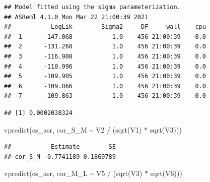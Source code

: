 \documentclass[
  12pt,
]{book}
\newenvironment{Shaded}{\begin{snugshade}}{\end{snugshade}}
\newcommand{\AttributeTok}[1]{\textcolor[rgb]{0.77,0.63,0.00}{#1}}
\newcommand{\ConstantTok}[1]{\textcolor[rgb]{0.00,0.00,0.00}{#1}}
\newcommand{\DecValTok}[1]{\textcolor[rgb]{0.00,0.00,0.81}{#1}}
\newcommand{\FunctionTok}[1]{\textcolor[rgb]{0.00,0.00,0.00}{#1}}
\newcommand{\NormalTok}[1]{#1}
\newcommand{\SpecialCharTok}[1]{\textcolor[rgb]{0.00,0.00,0.00}{#1}}
\begin{document}
\begin{verbatim}
## Model fitted using the sigma parameterization.
## ASReml 4.1.0 Mon Mar 22 21:00:39 2021
##           LogLik        Sigma2     DF     wall    cpu
##  1      -147.068           1.0    456 21:00:39    0.0
##  2      -131.268           1.0    456 21:00:39    0.0
##  3      -116.908           1.0    456 21:00:39    0.0
##  4      -110.996           1.0    456 21:00:39    0.0
##  5      -109.905           1.0    456 21:00:39    0.0
##  6      -109.866           1.0    456 21:00:39    0.0
##  7      -109.863           1.0    456 21:00:39    0.0
\end{verbatim}

\begin{Shaded}
\end{Shaded}

\begin{verbatim}
## [1] 0.0002038324
\end{verbatim}

\begin{Shaded}
\begin{Highlighting}[]
\FunctionTok{vpredict}\NormalTok{(cs\_asr, cor\_S\_M }\SpecialCharTok{\textasciitilde{}}\NormalTok{ V2 }\SpecialCharTok{/}\NormalTok{ (}\FunctionTok{sqrt}\NormalTok{(V1) }\SpecialCharTok{*} \FunctionTok{sqrt}\NormalTok{(V3)))}
\end{Highlighting}
\end{Shaded}

\begin{verbatim}
##           Estimate        SE
## cor_S_M -0.7741189 0.1869789
\end{verbatim}

\begin{Shaded}
\begin{Highlighting}[]
\FunctionTok{vpredict}\NormalTok{(cs\_asr, cor\_M\_L }\SpecialCharTok{\textasciitilde{}}\NormalTok{ V5 }\SpecialCharTok{/}\NormalTok{ (}\FunctionTok{sqrt}\NormalTok{(V3) }\SpecialCharTok{*} \FunctionTok{sqrt}\NormalTok{(V6)))}
\end{Highlighting}
\end{Shaded}
\end{document}
